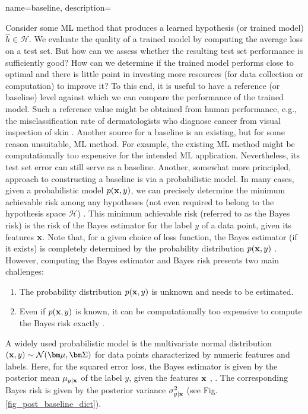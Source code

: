 {name={baseline},
    description={Consider some ML method that produces a learned 
    	hypothesis (or trained model) $\hat{h} \in \mathcal{H}$. We evaluate the quality of a trained model 
    by computing the average loss on a test set. But how can we assess 
    whether the resulting test set performance is sufficiently good? How can we 
    determine if the trained model performs close to optimal and there is little point 
    in investing more resources (for data collection or computation) to improve it? 
    To this end, it is useful to have a reference (or baseline) level against which 
    we can compare the performance of the trained model. Such a reference value 
    might be obtained from human performance, e.g., the misclassification rate of dermatologists 
    who diagnose cancer from visual inspection of skin \cite{SkinHumanAI}. Another source for a baseline is an existing, 
    but for some reason unsuitable, ML method. For example, the existing ML method 
    might be computationally too expensive for the intended ML application. 
    Nevertheless, its test set error can still serve as a baseline. Another, somewhat more principled, 
    approach to constructing a baseline is via a probabilistic model. In many cases, given a probabilistic model $p({\bf x},y)$,  
    we can precisely determine the minimum achievable risk among any hypotheses
    (not even required to belong to the hypothesis space $\mathcal{H}$) \cite{LC}. 
    This minimum achievable risk (referred to as the Bayes risk) is the risk 
    of the Bayes estimator for the label $y$ of a data point, given
    its features ${\bf x}$. Note that, for a given choice of loss function, the 
    Bayes estimator (if it exists) is completely determined by the probability distribution $p({\bf x},y)$ \cite[Ch. 4]{LC}. 
    However, computing the Bayes estimator and Bayes risk presents two 
    main challenges:
    \begin{enumerate}[label=\arabic*)]
    	\item The probability distribution $p({\bf x},y)$ is unknown and 
    needs to be estimated.
    	\item Even if $p({\bf x},y)$ is known, 
    it can be computationally too expensive to compute the Bayes risk exactly \cite{cooper1990computational}. 
   \end{enumerate}
A widely used probabilistic model is the multivariate normal distribution $\left( {\bf x},y \right) \sim \mathcal{N}({\bm \mu},{\bm \Sigma})$ 
for data points characterized by numeric features and labels.
Here, for the squared error loss, the Bayes estimator is given by the posterior 
mean $\mu_{y|{\bf x}}$ of the label $y$, given the 
features ${\bf x}$ \cite{LC}, \cite{GrayProbBook}. The corresponding Bayes risk 
is given by the posterior variance 
$\sigma^{2}_{y|{\bf x}}$ (see Fig. \ref{fig_post_baseline_dict}).
	\begin{figure}[H]
		\begin{center}
		\begin{tikzpicture}
			

\end{tikzpicture}
\end{center}
\end{figure}}}
